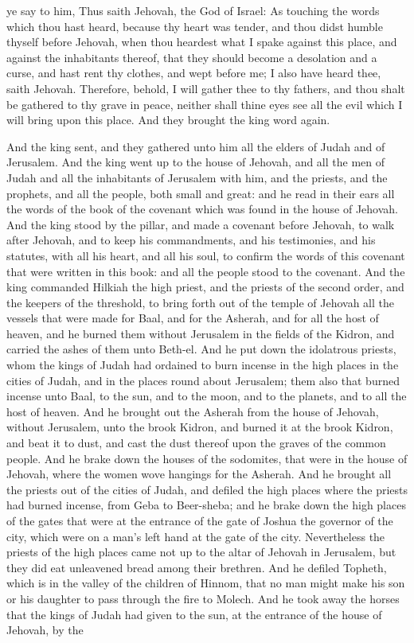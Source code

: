 ye say to him, Thus saith Jehovah, the God of Israel: As touching the words which thou hast heard, because thy heart was tender, and thou didst humble thyself before Jehovah, when thou heardest what I spake against this place, and against the inhabitants thereof, that they should become a desolation and a curse, and hast rent thy clothes, and wept before me; I also have heard thee, saith Jehovah. Therefore, behold, I will gather thee to thy fathers, and thou shalt be gathered to thy grave in peace, neither shall thine eyes see all the evil which I will bring upon this place. And they brought the king word again. 

And the king sent, and they gathered unto him all the elders of Judah and of Jerusalem. And the king went up to the house of Jehovah, and all the men of Judah and all the inhabitants of Jerusalem with him, and the priests, and the prophets, and all the people, both small and great: and he read in their ears all the words of the book of the covenant which was found in the house of Jehovah. And the king stood by the pillar, and made a covenant before Jehovah, to walk after Jehovah, and to keep his commandments, and his testimonies, and his statutes, with all his heart, and all his soul, to confirm the words of this covenant that were written in this book: and all the people stood to the covenant.  And the king commanded Hilkiah the high priest, and the priests of the second order, and the keepers of the threshold, to bring forth out of the temple of Jehovah all the vessels that were made for Baal, and for the Asherah, and for all the host of heaven, and he burned them without Jerusalem in the fields of the Kidron, and carried the ashes of them unto Beth-el. And he put down the idolatrous priests, whom the kings of Judah had ordained to burn incense in the high places in the cities of Judah, and in the places round about Jerusalem; them also that burned incense unto Baal, to the sun, and to the moon, and to the planets, and to all the host of heaven. And he brought out the Asherah from the house of Jehovah, without Jerusalem, unto the brook Kidron, and burned it at the brook Kidron, and beat it to dust, and cast the dust thereof upon the graves of the common people. And he brake down the houses of the sodomites, that were in the house of Jehovah, where the women wove hangings for the Asherah. And he brought all the priests out of the cities of Judah, and defiled the high places where the priests had burned incense, from Geba to Beer-sheba; and he brake down the high places of the gates that were at the entrance of the gate of Joshua the governor of the city, which were on a man’s left hand at the gate of the city. Nevertheless the priests of the high places came not up to the altar of Jehovah in Jerusalem, but they did eat unleavened bread among their brethren. And he defiled Topheth, which is in the valley of the children of Hinnom, that no man might make his son or his daughter to pass through the fire to Molech. And he took away the horses that the kings of Judah had given to the sun, at the entrance of the house of Jehovah, by the 